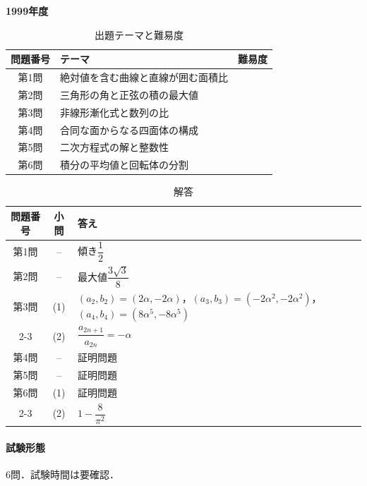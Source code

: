 \documentclass[../../main.tex]{subfiles}
\begin{document}
\begin{center}
  {\fontsize{48pt}{58pt}\selectfont \textbf{1999}\normalsize\textbf{年度}}
\end{center}

\begin{table}[htb]
  \centering
  \caption{出題テーマと難易度}
  \begin{tabular}{|c|p{9cm}|c|}
    \hline
    \textbf{問題番号} & \textbf{テーマ} & \textbf{難易度} \\
    \hline
    第1問 & 絶対値を含む曲線と直線が囲む面積比 & \\
    \hline
    第2問 & 三角形の角と正弦の積の最大値 & \\
    \hline
    第3問 & 非線形漸化式と数列の比 & \\
    \hline
    第4問 & 合同な面からなる四面体の構成 & \\
    \hline
    第5問 & 二次方程式の解と整数性 & \\
    \hline
    第6問 & 積分の平均値と回転体の分割 & \\
    \hline
  \end{tabular}
\end{table}

\begin{table}[htb]
  \centering
  \caption{解答}
  \renewcommand{\arraystretch}{1.4}
  \begin{tabular}{|c|c|p{9cm}|}
    \hline
    \textbf{問題番号} & \textbf{小問} & \textbf{答え} \\
    \hline
    第1問 & -- & 傾き$\dfrac{1}{2}$ \\
    \hline
    第2問 & -- & 最大値$\dfrac{3\sqrt{3}}{8}$ \\
    \hline
    第3問 & (1) & $(a_2,b_2)=(2\alpha,-2\alpha)$，$(a_3,b_3)=(-2\alpha^2,-2\alpha^2)$，$(a_4,b_4)=(8\alpha^5,-8\alpha^5)$ \\
    \cline{2-3}
    & (2) & $\dfrac{a_{2n+1}}{a_{2n}}=-\alpha$ \\
    \hline
    第4問 & -- & 証明問題 \\
    \hline
    第5問 & -- & 証明問題 \\
    \hline
    第6問 & (1) & 証明問題 \\
    \cline{2-3}
    & (2) & $1-\dfrac{8}{\pi^2}$ \\
    \hline
  \end{tabular}
\end{table}

\paragraph{試験形態}
6問．試験時間は要確認．
\end{document}

